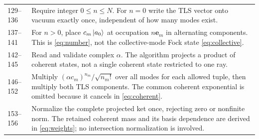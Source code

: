 \begin{longtable}{p{}p{}}
129--136 & Require integer $0\leq n\leq N$. For $n=0$ write the TLS vector onto vacuum exactly once, independent of how many modes exist.\\
137--141 & For $n>0$, place $c_m\left|a_0\right\rangle$ at occupation $n\bm e_m$ in alternating components. This is \eqref{eq:number}, not the collective-mode Fock state \eqref{eq:collective}.\\
142--145 & Read and validate complex $\alpha$. The algorithm projects a product of coherent states, not a single coherent state restricted to one ray.\\
146--152 & Multiply $(\alpha c_m)^{n_m}/\sqrt{n_m!}$ over all modes for each allowed tuple, then multiply both TLS components. The common coherent exponential is omitted because it cancels in \eqref{eq:coherent}.\\
153--156 & Normalize the complete projected ket once, rejecting zero or nonfinite norm. The retained coherent mass and its basis dependence are derived in \eqref{eq:weights}; no intersection normalization is involved.\\
\bottomrule\end{longtable}

